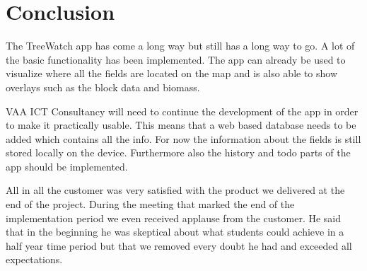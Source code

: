 \section{Conclusion}
The TreeWatch app has come a long way but still has a long way to go. A lot of the basic functionality has been implemented. The app can already be used to visualize where all the fields are located on the map and is also able to show overlays such as the block data and biomass.

VAA ICT Consultancy will need to continue the development of the app in order to make it practically usable. This means that a web based database needs to be added which contains all the info. For now the information about the fields is still stored locally on the device. Furthermore also the history and todo parts of the app should be implemented.

All in all the customer was very satisfied with the product we delivered at the end of the project. During the meeting that marked the end of the implementation period we even received applause from the customer. He said that in the beginning he was skeptical about what students could achieve in a half year time period but that we removed every doubt he had and exceeded all expectations.